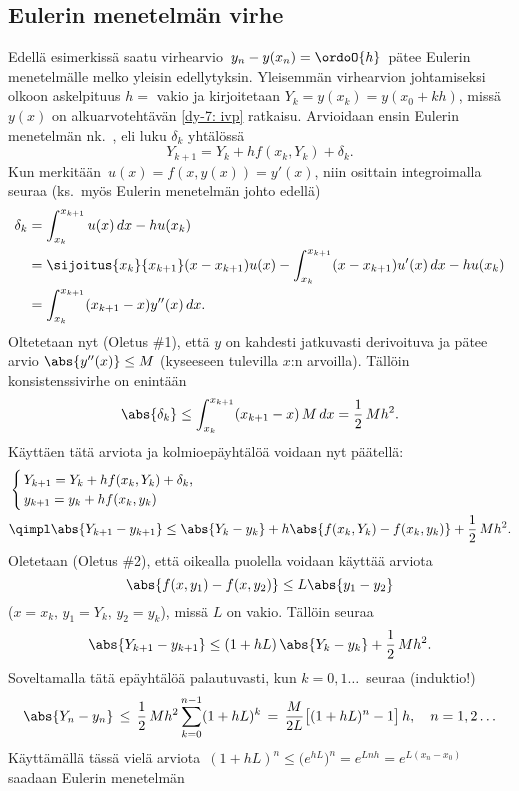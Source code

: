 \subsection{Eulerin menetelmän virhe}

Edellä esimerkissä saatu virhearvio $\,y_n-y(x_n)=\ordoO{h}\,$ pätee Eulerin menetelmälle melko
yleisin edellytyksin. Yleisemmän virhearvion johtamiseksi olkoon askelpituus $h=$ vakio ja 
kirjoitetaan $Y_k=y(x_k)=y(x_0+kh)$, missä $y(x)$ on alkuarvotehtävän \eqref{dy-7: ivp} 
%
ratkaisu. Arvioidaan ensin Eulerin menetelmän nk.\ , eli luku $\delta_k$
yhtälössä
\[
Y_{k+1}=Y_k+hf(x_k,Y_k)+\delta_k.
\]
Kun merkitään $\,u(x)=f(x,y(x))=y'(x)$, niin osittain integroimalla seuraa (ks.\ myös Eulerin
menetelmän johto edellä)
\begin{align*}
\delta_k &= \int_{x_k}^{x_{k+1}} u(x)\,dx - hu(x_k) \\
         &=\sijoitus{x_k}{x_{k+1}} (x-x_{k+1})u(x) - \int_{x_k}^{x_{k+1}} (x-x_{k+1})u'(x)\,dx
                                                   - hu(x_k) \\
         &= \int_{x_k}^{x_{k+1}} (x_{k+1}-x)y''(x)\,dx.
\end{align*}
Oltetetaan nyt (Oletus \#1), että $y$ on kahdesti jatkuvasti derivoituva ja pätee arvio
$\abs{y''(x)} \le M$ (kyseeseen tulevilla $x$:n arvoilla). Tällöin konsistenssivirhe on enintään
\[
\abs{\delta_k} \le \int_{x_k}^{x_{k+1}} (x_{k+1}-x)\,M\,dx = \frac{1}{2}\,Mh^2.
\]
Käyttäen tätä arviota ja kolmioepäyhtälöä voidaan nyt päätellä:
\begin{align*}
&\begin{cases} 
\, Y_{k+1}=Y_k+hf(x_k,Y_k)+\delta_k, \\ \,y_{k+1}=y_k+hf(x_k,y_k)
 \end{cases} \\
&\qimpl \abs{Y_{k+1}-y_{k+1}} \le \abs{Y_k-y_k}+h\abs{f(x_k,Y_k)-f(x_k,y_k)}+\frac{1}{2}\,Mh^2.
\end{align*}
Oletetaan (Oletus \#2), että oikealla puolella voidaan käyttää arviota
\[
\abs{f(x,y_1)-f(x,y_2)} \le L\abs{y_1-y_2}
\]
($x=x_k,\,y_1=Y_k,\,y_2=y_k$), missä $L$ on vakio. Tällöin seuraa
\[
\abs{Y_{k+1}-y_{k+1}} \le (1+hL)\,\abs{Y_k-y_k} + \frac{1}{2}\,Mh^2.
\]
Soveltamalla tätä epäyhtälöä palautuvasti, kun $k=0,1 \ldots\,$ seuraa (induktio!)
\[
\abs{Y_n-y_n}\,\le\,\frac{1}{2}\,Mh^2 \sum_{k=0}^{n-1} (1+hL)^k\,
                 =\,\frac{M}{2L}\bigl[(1+hL)^n-1\bigr]\,h, \quad n=1,2 \ldots
\]
Käyttämällä tässä vielä arviota 
$\,(1+hL)^n \le \bigl(e^{hL}\bigr)^n = e^{Lnh} = e^{L(x_n-x_0)}\,$ saadaan Eulerin menetelmän 
